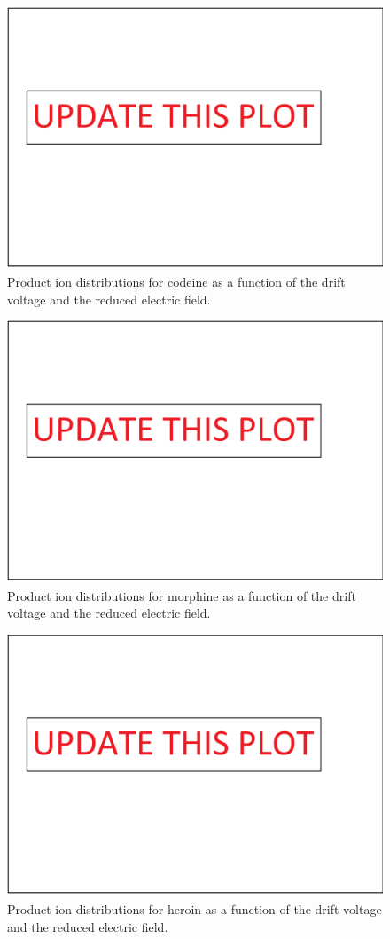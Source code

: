 \begin{figure}[htb]
\centering
\includegraphics[width=0.50\linewidth]{pics/other_drugs/codeine-br.png}
\caption{Product ion distributions for codeine as a function of the drift voltage and the reduced electric field.}
\label{fig:DR_codeine}
\end{figure}


\begin{figure}[htb]
\centering
\includegraphics[width=0.50\linewidth]{pics/other_drugs/morphine-br.png}
\caption{Product ion distributions for morphine as a function of the drift voltage and the reduced electric field.}
\label{fig:DR_morphine}
\end{figure}






\begin{figure}[htb]
\centering
\includegraphics[width=0.50\linewidth]{pics/other_drugs/heroin-br.png}
\caption{Product ion distributions for heroin as a function of the drift voltage and the reduced electric field.}
\label{fig:DR_CBN}
\end{figure}





